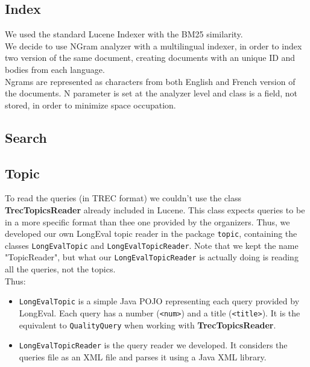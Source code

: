\subsection{Index}\label{subsec:index}
We used the standard Lucene Indexer with the BM25\cite{BM25} similarity.\\
We decide to use NGram analyzer with a multilingual indexer,
in order to index two version of the same document, creating documents with
an unique ID and bodies from each language.\\
Ngrams are represented as characters from both English and French version of
the documents. N parameter is set at the analyzer level and class is a field,
not stored, in order to minimize space occupation.\\

\subsection{Search}\label{subsec:search}

\subsection{Topic}\label{subsec:topic}
To read the queries (in TREC format) we couldn't use the class \textbf{TrecTopicsReader} already included in Lucene.
This class expects queries to be in a more specific format than thee one provided by the organizers.
Thus, we developed our own LongEval topic reader in the package \texttt{topic}, containing the classes
\texttt{LongEvalTopic} and \texttt{LongEvalTopicReader}.
Note that we kept the name "TopicReader", but what our \texttt{LongEvalTopicReader} is actually doing is reading
all the queries, not the topics. \\
Thus:
\begin{itemize}
    \item \texttt{LongEvalTopic} is a simple Java POJO representing each query provided by LongEval.
    Each query has a number (\texttt{<num>}) and a title (\texttt{<title>}).
    It is the equivalent to \texttt{QualityQuery} when working with \textbf{TrecTopicsReader}.
    \item \texttt{LongEvalTopicReader} is the query reader we developed.
    It considers the queries file as an XML file and parses it using a Java XML library.
\end{itemize}

